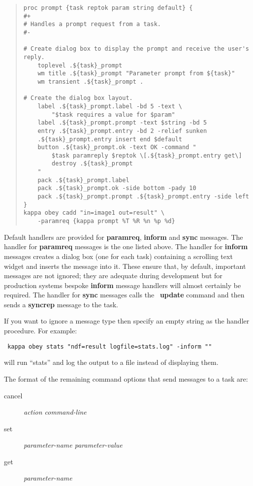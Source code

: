 \begin{quote}
\begin{verbatim}
proc prompt {task reptok param string default} {
#+
# Handles a prompt request from a task.
#-

# Create dialog box to display the prompt and receive the user's reply.
    toplevel .${task}_prompt
    wm title .${task}_prompt "Parameter prompt from ${task}"
    wm transient .${task}_prompt .

# Create the dialog box layout.
    label .${task}_prompt.label -bd 5 -text \
        "$task requires a value for $param"
    label .${task}_prompt.prompt -text $string -bd 5
    entry .${task}_prompt.entry -bd 2 -relief sunken
    .${task}_prompt.entry insert end $default
    button .${task}_prompt.ok -text OK -command "
        $task paramreply $reptok \[.${task}_prompt.entry get\]
        destroy .${task}_prompt
    "
    pack .${task}_prompt.label
    pack .${task}_prompt.ok -side bottom -pady 10
    pack .${task}_prompt.prompt .${task}_prompt.entry -side left
}
kappa obey cadd "in=image1 out=result" \
    -paramreq {kappa prompt %T %R %n %p %d} 
\end{verbatim}
\end{quote}

Default handlers are provided for {\bf paramreq}, {\bf inform} and {\bf sync} 
messages. The handler for {\bf paramreq} messages is the one listed above. The 
handler for {\bf inform} messages creates a dialog box (one for each task)
containing a scrolling text widget and inserts the message into it. These
ensure that, by default, important messages are not ignored; they are 
adequate during
development but for production systems bespoke {\bf inform} message handlers
will almost certainly be required. The handler for {\bf sync} messages 
calls the \Tcl\ {\bf update} command and then sends a {\bf syncrep} message to
the task.

If you want to ignore a message type then specify an empty string as
the handler procedure. For example:
\begin{tquote}{\tt
kappa obey stats "ndf=result logfile=stats.log" -inform ""
}\end{tquote}
will run ``stats'' and log the output to a file instead of displaying them.

The format of the remaining command options that send messages to a task are:
\begin{description}
\item[cancel] {\em action command-line}
\item[set] {\em parameter-name parameter-value}
\item[get] {\em parameter-name}
\end{description}


